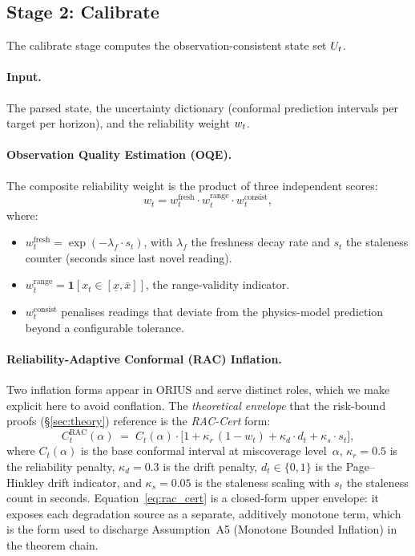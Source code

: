 \subsection{Stage 2: Calibrate}\label{sec:calibrate}

The calibrate stage computes the observation-consistent state set $U_t$.

\paragraph{Input.}  The parsed state, the uncertainty dictionary (conformal
prediction intervals per target per horizon), and the reliability weight $w_t$.

\paragraph{Observation Quality Estimation (OQE).}
The composite reliability weight is the product of three independent scores:
\begin{equation}\label{eq:oqe}
  w_t = w_t^{\mathrm{fresh}} \cdot w_t^{\mathrm{range}} \cdot w_t^{\mathrm{consist}},
\end{equation}
where:
\begin{itemize}[nosep]
  \item $w_t^{\mathrm{fresh}} = \exp(-\lambda_f \cdot s_t)$, with $\lambda_f$ the
        freshness decay rate and $s_t$ the staleness counter (seconds since last
        novel reading).
  \item $w_t^{\mathrm{range}} = \mathbf{1}[x_t \in [\underline{x}, \bar{x}]]$,
        the range-validity indicator.
  \item $w_t^{\mathrm{consist}}$ penalises readings that deviate from the
        physics-model prediction beyond a configurable tolerance.
\end{itemize}

\paragraph{Reliability-Adaptive Conformal (RAC) Inflation.}
Two inflation forms appear in ORIUS and serve distinct roles, which we make
explicit here to avoid conflation.  The \emph{theoretical envelope} that the
risk-bound proofs (\S\ref{sec:theory}) reference is the \emph{RAC-Cert} form:
\begin{equation}\label{eq:rac_cert}
  C_t^{\mathrm{RAC}}(\alpha)
  \;=\;
  C_t(\alpha) \cdot \bigl[1 + \kappa_r\,(1 - w_t) + \kappa_d \cdot d_t + \kappa_s \cdot s_t\bigr],
\end{equation}
where $C_t(\alpha)$ is the base conformal interval at miscoverage level~$\alpha$,
$\kappa_r = 0.5$ is the reliability penalty, $\kappa_d = 0.3$ is the drift
penalty, $d_t \in \{0,1\}$ is the Page--Hinkley drift indicator, and
$\kappa_s = 0.05$ is the staleness scaling with $s_t$ the staleness count in
seconds.  Equation~\eqref{eq:rac_cert} is a closed-form upper envelope: it
exposes each degradation source as a separate, additively monotone term, which
is the form used to discharge Assumption~A5 (Monotone Bounded Inflation) in the
theorem chain.

